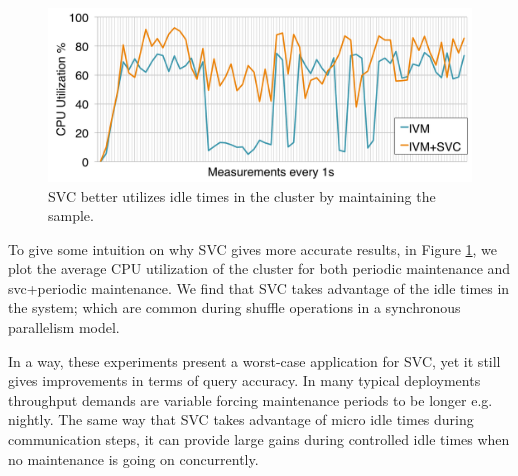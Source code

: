 \begin{figure}[t]
\centering
\includegraphics[scale=0.20]{exp/con_7.pdf}
 \caption{SVC better utilizes idle times in the cluster by maintaining the sample.\label{conv-5}} 
\end{figure}
To give some intuition on why SVC gives more accurate results, in Figure \ref{conv-5}, we plot the average CPU utilization of the cluster for both periodic maintenance and svc+periodic maintenance. 
We find that SVC takes advantage of the idle times in the system; which are common during shuffle operations in a synchronous parallelism model.

In a way, these experiments present a worst-case application for SVC, yet it still gives improvements in terms of query accuracy.
In many typical deployments throughput demands are variable forcing maintenance periods to be longer e.g. nightly.
The same way that SVC takes advantage of micro idle times during communication steps, it can provide large gains during controlled idle times when no maintenance is going on concurrently.


